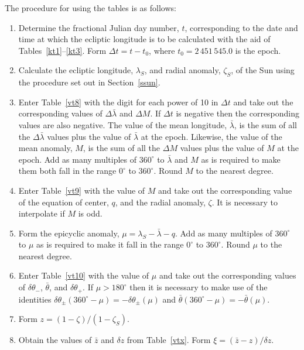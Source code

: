 The procedure for using the tables is as follows:
\begin{enumerate}

\item Determine the fractional Julian day number, $t$, corresponding to the date and time
at which the ecliptic longitude is to be calculated with the aid of Tables~\ref{kt1}--\ref{kt3}. Form $\Delta t = t-t_0$, where $t_0=2\,451\,545.0$ is the epoch. 

\item Calculate the ecliptic longitude, $\lambda_S$, and radial anomaly,
$\zeta_S$, of the Sun using the procedure set out in Section~\ref{ssun}.

\item Enter Table~\ref{vt8} with the digit for each power of 10
in ${\Delta} t$ and take out the corresponding values of $\Delta\bar{\lambda}$ and $\Delta M$. If $\Delta t$ is negative then the corresponding
values are also negative.
The value of the mean longitude, $\bar{\lambda}$, is the
sum of all the $\Delta\bar{\lambda}$ values plus the value of $\bar{\lambda}$ at the epoch. Likewise, the value of the mean anomaly, $M$, is
the sum of all the $\Delta M$ values plus the value of $M$ at the epoch. 
Add as many multiples of $360^\circ$ to $\bar{\lambda}$ and $M$
as is required to make them both fall in the range $0^\circ$ to $360^\circ$. Round $M$ to the nearest degree. 

\item Enter Table~\ref{vt9} with the value of $M$ and take out the
corresponding value of the equation of center, $q$, and the radial anomaly, $\zeta$. It is necessary to interpolate if $M$ is odd.

\item Form the epicyclic anomaly, $\mu = \lambda_S-\bar{\lambda}-q$. Add as many multiples of $360^\circ$ to $\mu$ as is required to make it fall in the range $0^\circ$ to $360^\circ$. Round $\mu$ to the nearest degree.

\item Enter Table~\ref{vt10} with the value of $\mu$ and take
out the corresponding values of $\delta\theta_-$, $\bar{\theta}$, and
$\delta\theta_+$. If $\mu > 180^\circ$ then it is necessary to make use
of the identities $\delta\theta_\pm(360^\circ - \mu) =-\delta\theta_\pm(\mu)$
and $\bar{\theta}(360^\circ - \mu) =-\bar{\theta}(\mu)$.

\item Form $z = (1-\zeta)/(1-\zeta_S)$.

\item Obtain the values of $\bar{z}$ and $\delta z$ from Table~\ref{vtx}.
Form $\xi = (\bar{z}-z)/\delta z$.


\end{enumerate}
